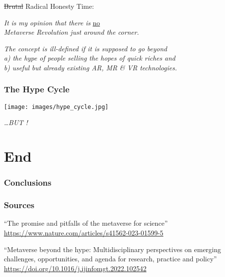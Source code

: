 \documentclass[aspectratio=169,x11names]{beamer}
\begin{document}
\begin{frame}
\Large
\sout{Brutal} Radical Honesty Time:\bigskip\bigskip\pause

\begin{center}
\emph{It is my opinion that there is} \underline{no}\\
\emph{Metaverse Revolution just around the corner.}\bigskip\pause

\emph{The concept is ill-defined if it is supposed to go beyond\\
a) the hype of people selling the hopes of quick riches and\\
b) useful but already existing AR, MR \& VR technologies.}
\end{center}
\end{frame}

\begin{frame}
\frametitle{The Hype Cycle}
\begin{center}
\texttt{[image: images/hype\_cycle.jpg]} 
\end{center}
\end{frame}

\begin{frame}
\begin{center}
\Huge
\emph{\dots BUT !}
\end{center}
\end{frame}

\section{End}
{
    
    \begin{frame}
	\frametitle{Conclusions}
	\end{frame}
    
    \begin{frame}[fragile]
    \frametitle{Sources}
    ``The promise and pitfalls of the metaverse for science''
	\url{https://www.nature.com/articles/s41562-023-01599-5}
	\bigskip
    
    ``Metaverse beyond the hype: Multidisciplinary perspectives on emerging challenges, opportunities, and agenda for research, practice and policy''
    \url{https://doi.org/10.1016/j.ijinfomgt.2022.102542}
    \vfill
    \end{frame}
}
\end{document}
